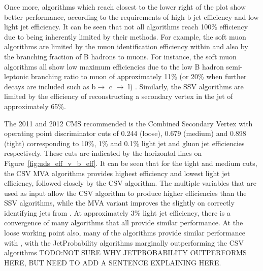 Once more, algorithms which reach closest to the lower right of the plot show better performance, according to
the requirements of high b jet efficiency and low light jet efficiency. It can be seen that not all algorithms
reach 100\% \bjet efficiency due to being inherently limited by their methods. For example, the soft muon
algorithms are limited by the muon identification efficiency within \bjets and also by the branching fraction
of B hadrons to muons. For instance, the soft muon algorithms all show low maximum \bjet efficiencies due to
the low B hadron semi-leptonic branching ratio to muon of approximately 11\% (or 20\% when further decays are
included such as b$\rightarrow$ c $\rightarrow$ l) \cite{Ferro:2012tg}. Similarly, the SSV algorithms are
limited by the efficiency of reconstructing a secondary vertex in the jet of approximately 65\%.

The 2011 and 2012 CMS recommended \btagger is the Combined Secondary Vertex with operating point discriminator
cuts of 0.244 (loose), 0.679 (medium) and 0.898 (tight) corresponding to 10\%, 1\% and 0.1\% light jet and
gluon jet efficiencies respectively. These cuts are indicated by the horizontal lines on
Figure~\ref{fig:uds_eff_v_b_eff}. It can be seen that for the tight and medium cuts, the CSV MVA algorithms
provides highest \bjet efficiency and lowest light jet efficiency, followed closely by the CSV algorithm.
The multiple variables that are used as input allow the CSV algorithm to produce higher efficiencies than the
SSV algorithms, while the MVA variant improves the slightly on correctly identifying jets from \bquarks. At
approximately 3\% light jet efficiency, there is a convergence of many algorithms that all provide similar
performance. At the loose working point also, many of the algorithms provide similar performance with \bjets,
with the JetProbability algorithms marginally outperforming the CSV algorithms TODO:NOT SURE WHY
JETPROBABILITY OUTPERFORMS HERE, BUT NEED TO ADD A SENTENCE EXPLAINING HERE.
